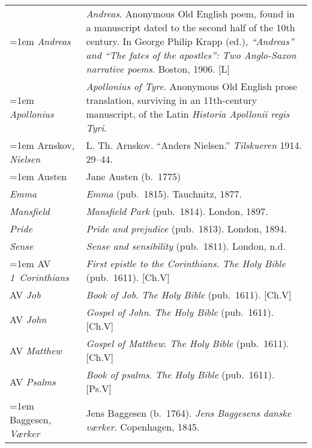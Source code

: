 \begin{xltabular}{\textwidth}{ lQ }
\hangindent=1em  \textit{Andreas} & \textit{Andreas}. Anonymous Old English poem, found in a manuscript dated to the second half of the 10th century. In George Philip Krapp (ed.), \textit{``Andreas'' and ``The fates of the apostles'': Two Anglo-Saxon narrative poems}. Boston, 1906. [L]\\  %

\hangindent=1em  \textit{Apollonius} & \textit{Apollonius of Tyre}. Anonymous Old English prose translation, surviving in an 11th-century manuscript, of the Latin \textit{Historia Apollonii regis Tyri}.\\

\hangindent=1em  Arnskov, \textit{Nielsen} & L. Th. Arnskov. ``Anders Nielsen.'' \textit{Tilskueren} 1914. 29--44. \\ %

\hangindent=1em  Austen & Jane Austen (b.~1775) \\
\hspace{1em}\textit{Emma} & \textit{Emma} (pub.~1815). Tauchnitz, 1877. \\
\hspace{1em}\textit{Mansfield} & \textit{Mansfield Park} (pub.~1814). London, 1897. \\
\hspace{1em}\textit{Pride} & \textit{Pride and prejudice} (pub.~1813). London, 1894. \\
\hspace{1em}\textit{Sense} & \textit{Sense and sensibility} (pub.~1811). London, n.d. \\

\hangindent=1em  AV \textit{1~Corinthians} & \textit{First epistle to the Corinthians}. \textit{The Holy Bible} (pub.~1611). [Ch.V] \\
AV \textit{Job} & \textit{Book of Job}. \textit{The Holy Bible} (pub.~1611). [Ch.V] \\
AV \textit{John} & \textit{Gospel of John}. \textit{The Holy Bible} (pub.~1611). [Ch.V] \\
AV \textit{Matthew} & \textit{Gospel of Matthew}. \textit{The Holy Bible} (pub.~1611). [Ch.V] \\
AV \textit{Psalms} & \textit{Book of psalms}. \textit{The Holy Bible} (pub.~1611). [Ps.V] \\

\hangindent=1em  Baggesen, \textit{Værker} & Jens Baggesen (b.~1764). \textit{Jens Baggesens danske værker}. Copenhagen, 1845. \\


\end{xltabular}
